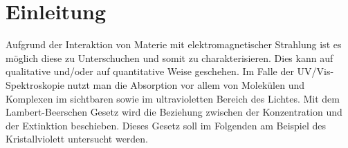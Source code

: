 %
%

\section{Einleitung}

Aufgrund der Interaktion von  Materie mit elektromagnetischer Strahlung ist es möglich diese zu Unterschuchen und somit zu charakterisieren. Dies kann auf qualitative und/oder auf quantitative Weise geschehen. Im Falle der UV/Vis-Spektroskopie nutzt man die Absorption vor allem von Molekülen und Komplexen im sichtbaren  sowie im ultravioletten Bereich des Lichtes. Mit dem Lambert-Beerschen Gesetz wird die Beziehung zwischen der Konzentration und der Extinktion beschieben. Dieses Gesetz soll im Folgenden am Beispiel des Kristallviolett untersucht werden.


%
